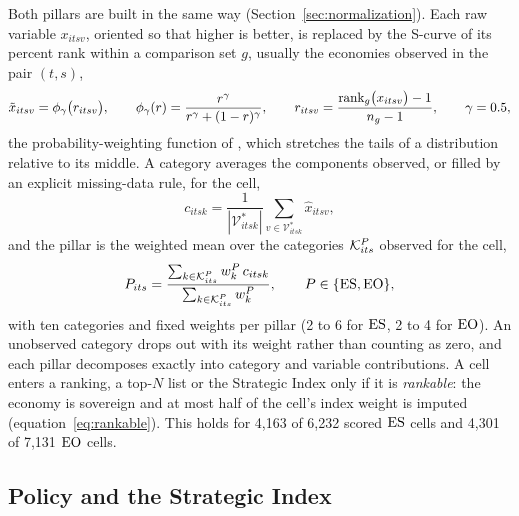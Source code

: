 Both pillars are built in the same way (Section~\ref{sec:normalization}). Each raw variable
$x_{itsv}$, oriented so that higher is better, is replaced by the S-curve of its percent rank
within a comparison set $g$, usually the economies observed in the pair $(t,s)$,
\begin{equation}\label{eq:fw_scurve}
  \tilde x_{itsv}=\phi_{\gamma}\bigl(r_{itsv}\bigr),\qquad
  \phi_{\gamma}(r)=\frac{r^{\gamma}}{r^{\gamma}+(1-r)^{\gamma}},\qquad
  r_{itsv}=\frac{\operatorname{rank}_g\bigl(x_{itsv}\bigr)-1}{n_g-1},\qquad \gamma=0.5 ,
\end{equation}
the probability-weighting function of \citet{karmarkar1978subjectively}, which stretches the tails
of a distribution relative to its middle. A category averages the components observed, or filled
by an explicit missing-data rule, for the cell,
\begin{equation}\label{eq:fw_category}
  c_{itsk}=\frac{1}{|\mathcal{V}^{*}_{itsk}|}\sum_{v\in\mathcal{V}^{*}_{itsk}}\hat x_{itsv},
\end{equation}
and the pillar is the weighted mean over the categories $\mathcal{K}^{P}_{its}$ observed for the cell,
\begin{equation}\label{eq:fw_pillar}
  P_{its}=\frac{\sum_{k\in\mathcal{K}^{P}_{its}}w^{P}_{k}\,c_{itsk}}{\sum_{k\in\mathcal{K}^{P}_{its}}w^{P}_{k}},
  \qquad P\in\{\mathrm{ES},\mathrm{EO}\},
\end{equation}
with ten categories and fixed weights per pillar (2 to 6 for $\mathrm{ES}$, 2 to 4 for $\mathrm{EO}$). An
unobserved category drops out with its weight rather than counting as zero, and each pillar
decomposes exactly into category and variable contributions. A cell enters a ranking, a top-$N$
list or the Strategic Index only if it is \emph{rankable}: the economy is sovereign and at most
half of the cell's index weight is imputed (equation~\eqref{eq:rankable}). This holds for 4,163
of 6,232 scored $\mathrm{ES}$ cells and 4,301 of 7,131 $\mathrm{EO}$ cells.

\subsection{Policy and the Strategic Index}\label{subsec:framework_si}

